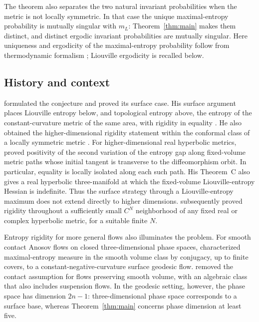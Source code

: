 \documentclass[11pt,a4paper]{article}
\theoremstyle{definition}
\theoremstyle{remark}
\numberwithin{equation}{section}
\begin{document}
The theorem also separates the two natural invariant probabilities
when the metric is not locally symmetric. In that case the unique
maximal-entropy probability is mutually singular with $m_L$:
Theorem~\ref{thm:main} makes them distinct, and distinct ergodic
invariant probabilities are mutually singular. Here uniqueness and
ergodicity of the maximal-entropy probability follow from thermodynamic
formalism \citep{BowenRuelle1975}; Liouville ergodicity is recalled below.

\subsection{History and context}

\citet[p.~347]{Katok1982} formulated the conjecture and proved its
surface case. His surface argument places Liouville entropy below,
and topological entropy above, the entropy of the constant-curvature
metric of the same area, with rigidity in equality
\citep[Theorem~B]{Katok1982}. He also obtained the higher-dimensional
rigidity statement within the conformal class of a locally symmetric
metric \citep[Corollary~2.5]{Katok1982}. For higher-dimensional real
hyperbolic metrics, \citet[Theorem~A]{Flaminio1995} proved positivity
of the second variation of the entropy gap along fixed-volume metric
paths whose initial tangent is transverse to the diffeomorphism orbit.
In particular, equality is locally isolated along each such path.
His Theorem~C also gives a real hyperbolic three-manifold at which
the fixed-volume Liouville-entropy Hessian is indefinite. Thus the
surface strategy through a Liouville-entropy maximum does not extend
directly to higher dimensions.
\citet[Theorem~1]{Humbert2026} subsequently proved rigidity throughout
a sufficiently small $C^N$ neighborhood of any fixed real or complex
hyperbolic metric, for a suitable finite $N$.

Entropy rigidity for more general flows also illuminates the problem.
For smooth contact Anosov flows on closed three-dimensional phase
spaces, \citet{Foulon2001} characterized maximal-entropy measure in the
smooth volume class by conjugacy, up to finite covers, to a
constant-negative-curvature surface geodesic flow.
\citet[Theorem~A]{DeSimoiLeguilVinhageYang2020} removed the contact
assumption for flows preserving smooth volume, with an algebraic
class that also includes suspension flows. In the
geodesic setting, however, the phase space has dimension $2n-1$:
three-dimensional phase space corresponds to a surface base, whereas
Theorem~\ref{thm:main} concerns phase dimension at least five.
\end{document}
